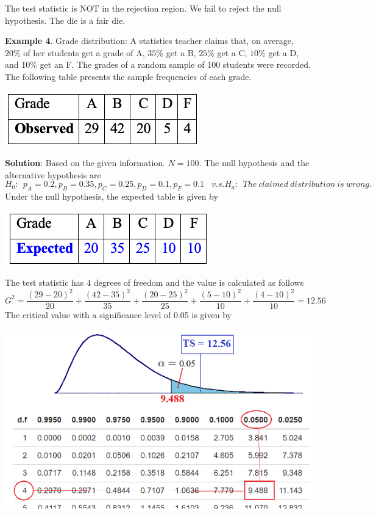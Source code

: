 \documentclass[
]{article}
\begin{document}
The test statistic is NOT in the rejection region. We fail to reject the
null hypothesis. The die is a fair die.

\textbf{Example 4}. Grade distribution: A statistics teacher claims
that, on average, \(20\%\) of her students get a grade of A, \(35\%\)
get a B, \(25\%\) get a C, \(10\%\) get a D, and \(10\%\) get an F. The
grades of a random sample of 100 students were recorded. The following
table presents the sample frequencies of each grade.

\begin{center}\includegraphics[width=0.25\linewidth]{week13/example04Data} \end{center}

\textbf{Solution}: Based on the given information. \(N = 100\). The null
hypothesis and the alternative hypothesis are \[
H_0: \ \ p_A = 0.2, p_B = 0.35, p_C = 0.25, p_D = 0.1, p_F = 0.1 \ \ \ \ v.s. H_a: \ \ The \ claimed \ distribution \ is \ wrong.
\] Under the null hypothesis, the expected table is given by

\begin{center}\includegraphics[width=0.25\linewidth]{week13/example04ExpTable} \end{center}

The test statistic has 4 degrees of freedom and the value is calculated
as follows \[
G^2=\frac{(29-20)^2}{20}+\frac{(42-35)^2}{35}+\frac{(20-25)^2}{25}+\frac{(5-10)^2}{10}+\frac{(4-10)^2}{10}=12.56
\] The critical value with a significance level of 0.05 is given by

\begin{center}\includegraphics[width=0.75\linewidth]{week13/example04CV} \end{center}
\end{document}
